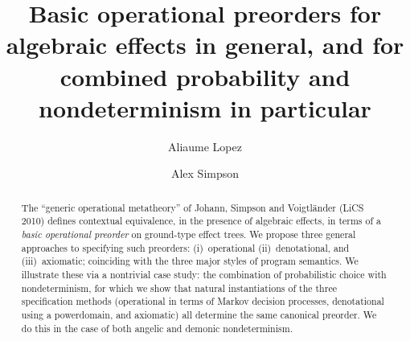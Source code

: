 \documentclass[a4paper,UKenglish]{lipics-v2018}
\title{Basic operational preorders  for algebraic effects in general, and for
combined probability and nondeterminism in particular}
\author{Aliaume Lopez}{\'Ecole Normale Sup\'erieure Paris-Saclay\\{Universit\'e Paris-Saclay, France}}{aliaume.lopez@ens-paris-saclay.fr}{}{}%
\author{Alex Simpson}{Faculty of Mathematics and Physics\\{University of Ljubljana, Slovenia}}{Alex.Simpson@fmf.uni-lj.si}{}{Research supported by: [[TO COMPLETE]]}
\begin{document}
\maketitle

\begin{abstract}
The ``generic operational metatheory'' of  Johann, Simpson and Voigtl\"{a}nder (LiCS 2010) defines
contextual equivalence, 
in the presence of algebraic effects, in terms of a
\emph{basic operational preorder} on ground-type effect trees. We propose three general approaches to 
specifying such preorders: (i)~operational (ii)~denotational, and (iii)~axiomatic; coinciding with the three major styles of program semantics. We illustrate these via a nontrivial case study: the combination of probabilistic choice with nondeterminism, for which we show that  natural instantiations of the three specification methods (operational in terms of Markov decision processes, denotational using  a powerdomain, and axiomatic) all determine the same canonical preorder. We do this in the case of both angelic and demonic nondeterminism. 
 \end{abstract}
























%

%

%

%



%

%

%

%

%
\end{document}
